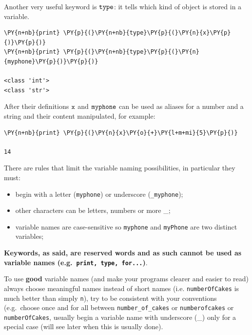 Another very useful keyword is \(\tt{type}\): it tells which kind of object is stored in a variable.

\begin{tcolorbox}[breakable, size=fbox, boxrule=1pt, pad at break*=1mm, colback=cellbackground, colframe=cellborder]
\begin{Verbatim}[commandchars=\\\{\}]
\PY{n+nb}{print} \PY{p}{(}\PY{n+nb}{type}\PY{p}{(}\PY{n}{x}\PY{p}{)}\PY{p}{)}
\PY{n+nb}{print} \PY{p}{(}\PY{n+nb}{type}\PY{p}{(}\PY{n}{myphone}\PY{p}{)}\PY{p}{)}

<class 'int'>
<class 'str'>
\end{Verbatim}
\end{tcolorbox}

After their definitions \(\tt{x}\) and \(\tt{myphone}\) can be used as aliases for a number and a string and their content manipulated, for example:

\begin{tcolorbox}[breakable, size=fbox, boxrule=1pt, pad at break*=1mm, colback=cellbackground, colframe=cellborder]
\begin{Verbatim}[commandchars=\\\{\}]
\PY{n+nb}{print} \PY{p}{(}\PY{n}{x}\PY{o}{+}\PY{l+m+mi}{5}\PY{p}{)}

14
\end{Verbatim}
\end{tcolorbox}

There are rules that limit the variable naming possibilities, in particular they must:
\begin{itemize}
\item begin with a letter (\texttt{myphone}) or underscore (\texttt{\_myphone});
\item other characters can be letters, numbers or more \_;
\item variable names are case-sensitive so \texttt{myphone} and \texttt{myPhone} are two distinct variables;
\end{itemize}

\textbf{Keywords, as said, are reserved words and as such cannot be used as variable names (e.g.~\texttt{print, type, for...})}.

To use \textbf{good} variable names (and make your programs clearer and easier to read) always choose meaningful names instead of short names (i.e. \texttt{numberOfCakes} is much better than simply \texttt{n}), try to be consistent with your conventions (e.g.~choose once and for all between \texttt{number\_of\_cakes} or \texttt{numberofcakes} or \texttt{numberOfCakes}, usually begin a variable name with underscore (\_) only for a special case (will see later when this is usually done).

